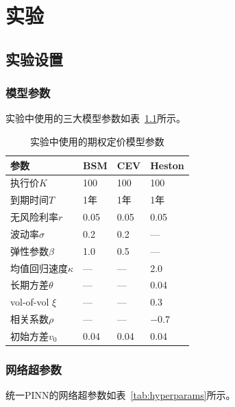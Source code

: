 \chapter{实验}\label{chap:experiment}

\section{实验设置}\label{sec:exp_setup}

\subsection{模型参数}

实验中使用的三大模型参数如表~\ref{tab:model_params}所示。

\begin{table}[htbp]
  \centering
  \caption{实验中使用的期权定价模型参数}
  \label{tab:model_params}
  \begin{tabular}{llll}
    \hline
    参数 & BSM & CEV & Heston \\
    \hline
    执行价$K$ & 100 & 100 & 100 \\
    到期时间$T$ & 1年 & 1年 & 1年 \\
    无风险利率$r$ & 0.05 & 0.05 & 0.05 \\
    波动率$\sigma$ & 0.2 & 0.2 & --- \\
    弹性参数$\beta$ & 1.0 & 0.5 & --- \\
    均值回归速度$\kappa$ & --- & --- & 2.0 \\
    长期方差$\theta$ & --- & --- & 0.04 \\
    vol-of-vol $\xi$ & --- & --- & 0.3 \\
    相关系数$\rho$ & --- & --- & $-0.7$ \\
    初始方差$v_0$ & 0.04 & 0.04 & 0.04 \\
    \hline
  \end{tabular}
\end{table}

\subsection{网络超参数}

统一PINN的网络超参数如表~\ref{tab:hyperparams}所示。

